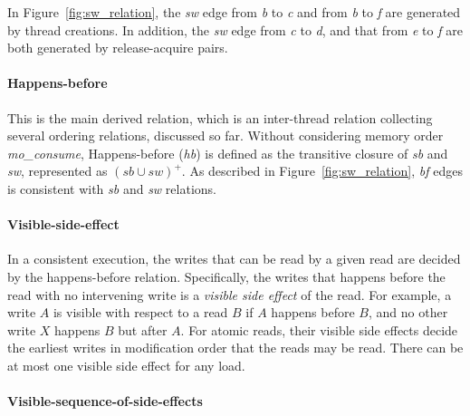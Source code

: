 \documentclass[preprint, numbers, 10pt]{sigplanconf}
\begin{document}
In Figure~\ref{fig:sw_relation}, the \textit{sw} edge from \textit{b} to \textit{c}
and from \textit{b} to \textit{f} are generated by thread creations. In addition,
the \textit{sw} edge from \textit{c} to \textit{d}, and that from \textit{e} to
\textit{f} are both generated by release-acquire pairs. 

\paragraph{Happens-before}

This is the main derived relation, which is an inter-thread relation 
collecting several ordering relations, discussed so far. 
Without considering memory order \textit{mo\_consume}, 
Happens-before (\textit{hb}) is defined as the transitive 
closure of \textit{sb} and \textit{sw}, represented as $(sb\cup sw)^+$. 
As described in Figure~\ref{fig:sw_relation}, \textit{bf} edges is consistent
with \textit{sb} and \textit{sw} relations.  

\paragraph{Visible-side-effect}

In a consistent execution, the writes that can be read by a given read 
are decided by the happens-before relation. Specifically, the writes that
happens before the read with no intervening write is a\textit{ visible side effect} 
of the read. For example, a write $A$ is visible with respect to a read $B$ if 
$A$ happens before $B$, and no other write $X$ happens $B$ but after $A$. 
For atomic reads, their visible side effects decide the earliest writes 
in modification order that the reads may be read. 
There can be at most one visible side effect for any load. 

\paragraph{Visible-sequence-of-side-effects} 
\end{document}
